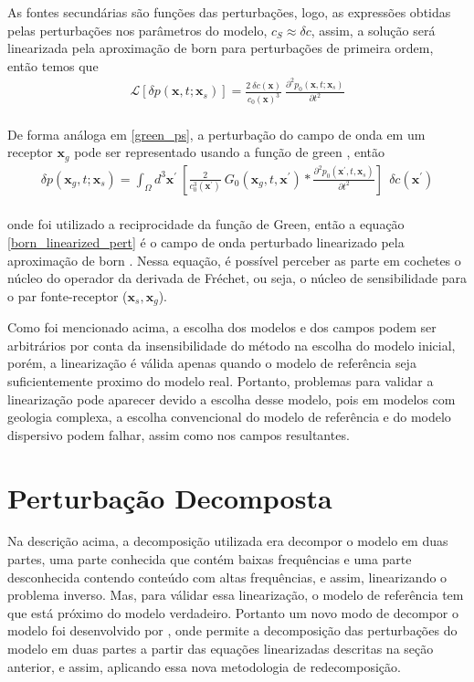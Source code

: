     As fontes secundárias são funções das perturbações, logo,  as expressões obtidas pelas perturbações nos parâmetros do modelo, $c_{S} \approx \delta c$, assim, a solução será linearizada pela  aproximação de born para perturbações de primeira ordem, então temos que %
    \begin{eqnarray}
     \mathcal{L} [ \delta p(\mathbf{x},t;\mathbf{x}_{s}) ] = \frac{2~\delta c(\mathbf{x})}{c_{0}(\mathbf{x})^{3}}~\frac{\partial^{2} p_{0}(\mathbf{x},t;\mathbf{x}_{s})}{\partial t^{2}} 
     \label{residual_wavefield_singular}
    \end{eqnarray}
    \\
 De forma análoga em \ref{green_ps}, a perturbação do campo de onda em um receptor $\mathbf{x}_{g}$ pode ser representado usando a função de green , então \\
    \begin{eqnarray}
     \delta p (\mathbf{x}_{g},t;\mathbf{x}_{s}) = \int_{\Omega} d^{3} \mathbf{x}^{\prime}~\left[\frac{2}{c_{0}^{3}(\mathbf{x}^{\prime})}~ G_0(\mathbf{x}_{g},t,\mathbf{x}^{\prime}) * \frac{\partial^{2} p_{0}(\mathbf{x}^{\prime},t,\mathbf{x}_{s})}{\partial t^{2}}\right] ~~\delta c(\mathbf{x}^{\prime})
     \label{born_linearized_pert}
    \end{eqnarray}
\\
    onde foi utilizado a reciprocidade da função de Green, então a equação \ref{born_linearized_pert} é o campo de onda perturbado linearizado pela aproximação de born \citep{tarantola_2005}. Nessa equação, é possível perceber as parte em cochetes o núcleo do operador da derivada de Fréchet, ou seja, o núcleo de sensibilidade para o par fonte-receptor ($\mathbf{x}_{s},\mathbf{x}_{g}$).
      
    Como foi mencionado acima, a escolha dos modelos e dos campos podem ser arbitrários por conta da insensibilidade do método na escolha do modelo inicial, porém, a linearização é válida apenas quando o modelo de referência seja suficientemente proximo do modelo real. Portanto, problemas para validar a linearização pode aparecer devido a escolha desse modelo, pois em modelos com geologia complexa, a escolha convencional do modelo de referência e do modelo dispersivo podem falhar, assim como nos campos resultantes.
    

\section{Perturbação Decomposta}
Na descrição acima, a decomposição utilizada era decompor o modelo em duas partes, uma parte conhecida que contém baixas frequências e uma parte desconhecida contendo conteúdo com altas frequências, e assim, linearizando o problema inverso. Mas, para válidar essa linearização, o modelo de referência tem que está próximo do modelo verdadeiro. Portanto um novo modo de decompor o modelo foi desenvolvido por \citet{macedo_2014}, onde permite a decomposição das perturbações do modelo em duas partes a partir das equações linearizadas descritas na seção anterior, e assim, aplicando essa nova metodologia de redecomposição.

